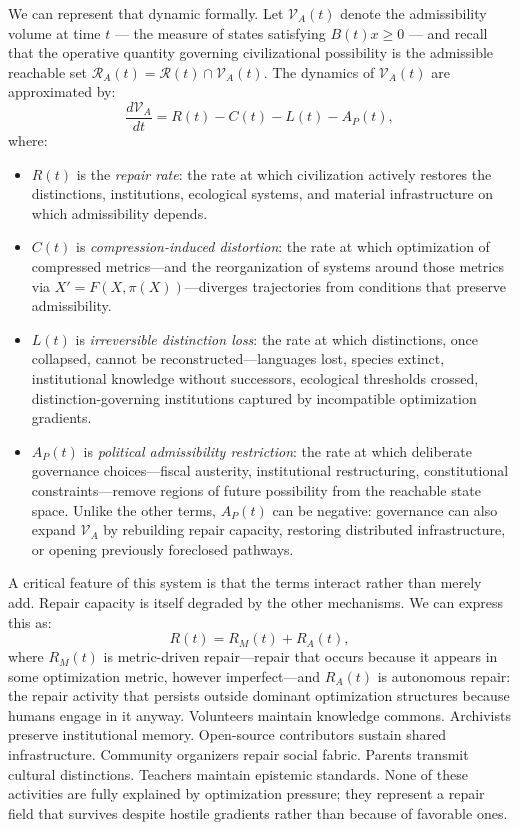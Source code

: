 \documentclass[11pt, letterpaper]{article}
\begin{document}
We can represent that dynamic formally. Let $\mathcal{V}_A(t)$ denote the admissibility volume at time $t$ — the measure of states satisfying $B(t)x \geq 0$ — and recall that the operative quantity governing civilizational possibility is the admissible reachable set $\mathcal{R}_A(t) = \mathcal{R}(t) \cap \mathcal{V}_A(t)$. The dynamics of $\mathcal{V}_A(t)$ are approximated by:
\[
  \frac{d\mathcal{V}_A}{dt} = R(t) - C(t) - L(t) - A_P(t),
\]
where:
\begin{itemize}[leftmargin=2em]
  \item $R(t)$ is the \emph{repair rate}: the rate at which civilization actively restores the distinctions, institutions, ecological systems, and material infrastructure on which admissibility depends.
  \item $C(t)$ is \emph{compression-induced distortion}: the rate at which optimization of compressed metrics---and the reorganization of systems around those metrics via $X' = F(X, \pi(X))$---diverges trajectories from conditions that preserve admissibility.
  \item $L(t)$ is \emph{irreversible distinction loss}: the rate at which distinctions, once collapsed, cannot be reconstructed---languages lost, species extinct, institutional knowledge without successors, ecological thresholds crossed, distinction-governing institutions captured by incompatible optimization gradients.
  \item $A_P(t)$ is \emph{political admissibility restriction}: the rate at which deliberate governance choices---fiscal austerity, institutional restructuring, constitutional constraints---remove regions of future possibility from the reachable state space. Unlike the other terms, $A_P(t)$ can be negative: governance can also expand $\mathcal{V}_A$ by rebuilding repair capacity, restoring distributed infrastructure, or opening previously foreclosed pathways.
\end{itemize}

A critical feature of this system is that the terms interact rather than merely add. Repair capacity is itself degraded by the other mechanisms. We can express this as:
\[
  R(t) = R_M(t) + R_A(t),
\]
where $R_M(t)$ is metric-driven repair---repair that occurs because it appears in some optimization metric, however imperfect---and $R_A(t)$ is autonomous repair: the repair activity that persists outside dominant optimization structures because humans engage in it anyway. Volunteers maintain knowledge commons. Archivists preserve institutional memory. Open-source contributors sustain shared infrastructure. Community organizers repair social fabric. Parents transmit cultural distinctions. Teachers maintain epistemic standards. None of these activities are fully explained by optimization pressure; they represent a repair field that survives despite hostile gradients rather than because of favorable ones.
\end{document}
